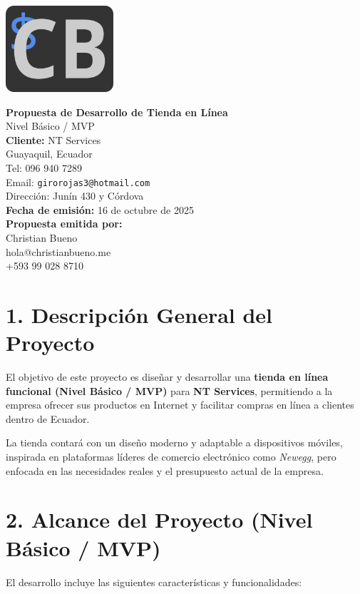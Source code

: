 \documentclass[12pt,a4paper]{article}
\begin{document}
\begin{titlepage}
    \centering
    \includegraphics[width=4cm]{logo.png}

    \vspace*{2cm}
    {\Huge \textbf{Propuesta de Desarrollo de Tienda en Línea}}\\[0.5cm]
    {\Large Nivel Básico / MVP}\\[1.5cm]

    \textbf{Cliente:} NT Services\\
    Guayaquil, Ecuador\\
    Tel: 096 940 7289\\
    Email: \texttt{girorojas3@hotmail.com}\\
    Dirección: Junín 430 y Córdova\\[1cm]

    \textbf{Fecha de emisión:} 16 de octubre de 2025\\[4cm]

    \vfill
    \textbf{Propuesta emitida por:}\\
    Christian Bueno \\
    hola@christianbueno.me \\
    +593 99 028 8710

    \vspace*{1cm}
\end{titlepage}

\section*{1. Descripción General del Proyecto}
El objetivo de este proyecto es diseñar y desarrollar una \textbf{tienda en línea funcional (Nivel Básico / MVP)} para \textbf{NT Services}, permitiendo a la empresa ofrecer sus productos en Internet y facilitar compras en línea a clientes dentro de Ecuador.

La tienda contará con un diseño moderno y adaptable a dispositivos móviles, inspirada en plataformas líderes de comercio electrónico como \textit{Newegg}, pero enfocada en las necesidades reales y el presupuesto actual de la empresa.

\section*{2. Alcance del Proyecto (Nivel Básico / MVP)}
El desarrollo incluye las siguientes características y funcionalidades:
\end{document}
